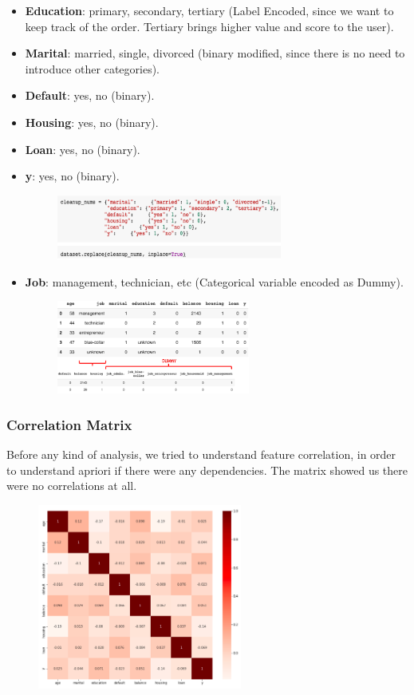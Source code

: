 \begin{itemize}
\item \textbf{Education}: primary, secondary, tertiary (Label Encoded, since we want to keep track of the order. Tertiary brings higher value and score to the user).
\item \textbf{Marital}: married, single, divorced (binary modified, since there is no need to introduce other categories).
\item \textbf{Default}: yes, no (binary).
\item \textbf{Housing}: yes, no (binary).
\item \textbf{Loan}: yes, no (binary).
\item \textbf{y}: yes, no (binary).

\begin{figure}[H]
\centering
\includegraphics[width=0.7\textwidth]{Img/clean_up.png}
\end{figure}
\item \textbf{Job}:  management, technician, etc (Categorical variable encoded as Dummy).
\begin{figure}[H]
\centering
\includegraphics[width=0.6\textwidth]{Img/dummy.png}
\end{figure}
\end{itemize}

\subsubsection{Correlation Matrix}
Before any kind of analysis, we tried to understand feature correlation, in order to understand apriori if there were any dependencies. The matrix showed us there were no correlations at all.
\begin{figure}[H]
\centering
\includegraphics[width=0.6\textwidth]{Img/correlation_bank.png}
\end{figure}
